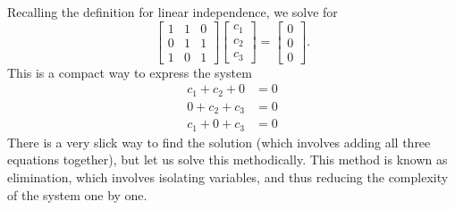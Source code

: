 Recalling the definition for linear independence, we solve for 
\[
\begin{bmatrix}
	1&1&0\\
	0& 1 & 1\\
	1& 0 & 1
\end{bmatrix} \begin{bmatrix}
	c_1 \\ c_2\\c_3
\end{bmatrix} = \begin{bmatrix}
	0\\0\\0
\end{bmatrix}.
\]
This is a compact way to express the system
\begin{align*}
	c_1 + c_2 + 0 &= 0 \\
	 0+  c_2 +  c_3 &= 0\\
	c_1+ 0+c_3 &= 0
\end{align*}
There is a very slick way to find the solution (which involves adding all three equations together), but let us solve this methodically. This method is known as elimination, which involves isolating variables, and thus reducing the complexity of the system one by one.
